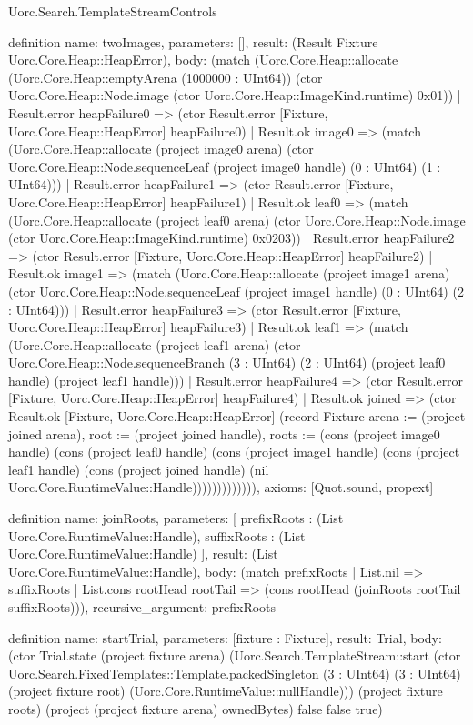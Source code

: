 \begin{lexlean}{Uorc.Search.TemplateStreamControls}
\begin{semanticmodule}
definition{
  name: twoImages,
  parameters: [],
  result: (Result Fixture Uorc.Core.Heap::HeapError),
  body: (match (Uorc.Core.Heap::allocate (Uorc.Core.Heap::emptyArena (1000000 : UInt64)) (ctor Uorc.Core.Heap::Node.image (ctor Uorc.Core.Heap::ImageKind.runtime) 0x01))
    | Result.error heapFailure0 => (ctor Result.error [Fixture, Uorc.Core.Heap::HeapError] heapFailure0)
    | Result.ok image0 => (match (Uorc.Core.Heap::allocate (project image0 arena) (ctor Uorc.Core.Heap::Node.sequenceLeaf (project image0 handle) (0 : UInt64) (1 : UInt64)))
      | Result.error heapFailure1 => (ctor Result.error [Fixture, Uorc.Core.Heap::HeapError] heapFailure1)
      | Result.ok leaf0 => (match (Uorc.Core.Heap::allocate (project leaf0 arena) (ctor Uorc.Core.Heap::Node.image (ctor Uorc.Core.Heap::ImageKind.runtime) 0x0203))
        | Result.error heapFailure2 => (ctor Result.error [Fixture, Uorc.Core.Heap::HeapError] heapFailure2)
        | Result.ok image1 => (match (Uorc.Core.Heap::allocate (project image1 arena) (ctor Uorc.Core.Heap::Node.sequenceLeaf (project image1 handle) (0 : UInt64) (2 : UInt64)))
          | Result.error heapFailure3 => (ctor Result.error [Fixture, Uorc.Core.Heap::HeapError] heapFailure3)
          | Result.ok leaf1 => (match (Uorc.Core.Heap::allocate (project leaf1 arena) (ctor Uorc.Core.Heap::Node.sequenceBranch (3 : UInt64) (2 : UInt64) (project leaf0 handle) (project leaf1 handle)))
            | Result.error heapFailure4 => (ctor Result.error [Fixture, Uorc.Core.Heap::HeapError] heapFailure4)
            | Result.ok joined => (ctor Result.ok [Fixture, Uorc.Core.Heap::HeapError] (record Fixture {arena := (project joined arena), root := (project joined handle), roots := (cons (project image0 handle) (cons (project leaf0 handle) (cons (project image1 handle) (cons (project leaf1 handle) (cons (project joined handle) (nil Uorc.Core.RuntimeValue::Handle))))))}))))))),
  axioms: [Quot.sound, propext]
}

definition{
  name: joinRoots,
  parameters: [
    prefixRoots : (List Uorc.Core.RuntimeValue::Handle),
    suffixRoots : (List Uorc.Core.RuntimeValue::Handle)
  ],
  result: (List Uorc.Core.RuntimeValue::Handle),
  body: (match prefixRoots
    | List.nil => suffixRoots
    | List.cons rootHead rootTail => (cons rootHead (joinRoots rootTail suffixRoots))),
  recursive_argument: prefixRoots
}

definition{
  name: startTrial,
  parameters: [fixture : Fixture],
  result: Trial,
  body: (ctor Trial.state (project fixture arena) (Uorc.Search.TemplateStream::start (ctor Uorc.Search.FixedTemplates::Template.packedSingleton (3 : UInt64) (3 : UInt64) (project fixture root) (Uorc.Core.RuntimeValue::nullHandle))) (project fixture roots) (project (project fixture arena) ownedBytes) false false true)
}


\end{semanticmodule}
\end{lexlean}
